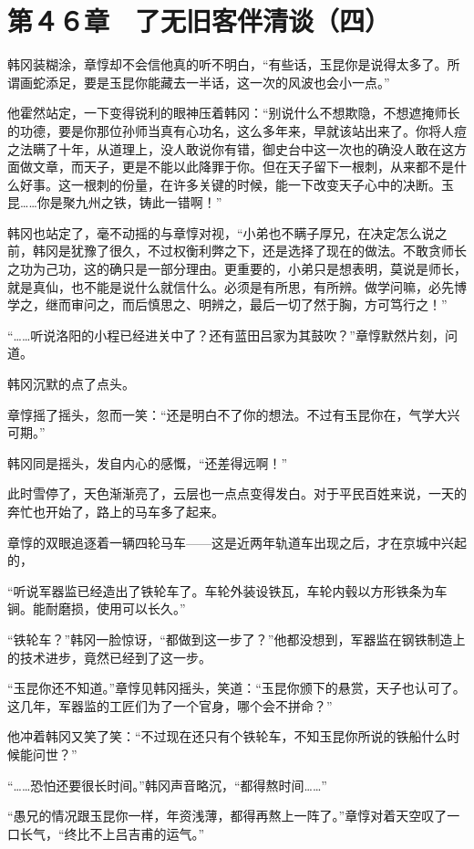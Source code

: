 \section{第４６章　了无旧客伴清谈（四）}

韩冈装糊涂，章惇却不会信他真的听不明白，“有些话，玉昆你是说得太多了。所谓画蛇添足，要是玉昆你能藏去一半话，这一次的风波也会小一点。”

他霍然站定，一下变得锐利的眼神压着韩冈：“别说什么不想欺隐，不想遮掩师长的功德，要是你那位孙师当真有心功名，这么多年来，早就该站出来了。你将人痘之法瞒了十年，从道理上，没人敢说你有错，御史台中这一次也的确没人敢在这方面做文章，而天子，更是不能以此降罪于你。但在天子留下一根刺，从来都不是什么好事。这一根刺的份量，在许多关键的时候，能一下改变天子心中的决断。玉昆……你是聚九州之铁，铸此一错啊！”

韩冈也站定了，毫不动摇的与章惇对视，“小弟也不瞒子厚兄，在决定怎么说之前，韩冈是犹豫了很久，不过权衡利弊之下，还是选择了现在的做法。不敢贪师长之功为己功，这的确只是一部分理由。更重要的，小弟只是想表明，莫说是师长，就是真仙，也不能是说什么就信什么。必须是有所思，有所辨。做学问嘛，必先博学之，继而审问之，而后慎思之、明辨之，最后一切了然于胸，方可笃行之！”

“……听说洛阳的小程已经进关中了？还有蓝田吕家为其鼓吹？”章惇默然片刻，问道。

韩冈沉默的点了点头。

章惇摇了摇头，忽而一笑：“还是明白不了你的想法。不过有玉昆你在，气学大兴可期。”

韩冈同是摇头，发自内心的感慨，“还差得远啊！”

此时雪停了，天色渐渐亮了，云层也一点点变得发白。对于平民百姓来说，一天的奔忙也开始了，路上的马车多了起来。

章惇的双眼追逐着一辆四轮马车——这是近两年轨道车出现之后，才在京城中兴起的，

“听说军器监已经造出了铁轮车了。车轮外装设铁瓦，车轮内毂以方形铁条为车锏。能耐磨损，使用可以长久。”

“铁轮车？”韩冈一脸惊讶，“都做到这一步了？”他都没想到，军器监在钢铁制造上的技术进步，竟然已经到了这一步。

“玉昆你还不知道。”章惇见韩冈摇头，笑道：“玉昆你颁下的悬赏，天子也认可了。这几年，军器监的工匠们为了一个官身，哪个会不拼命？”

他冲着韩冈又笑了笑：“不过现在还只有个铁轮车，不知玉昆你所说的铁船什么时候能问世？”

“……恐怕还要很长时间。”韩冈声音略沉，“都得熬时间……”

“愚兄的情况跟玉昆你一样，年资浅薄，都得再熬上一阵了。”章惇对着天空叹了一口长气，“终比不上吕吉甫的运气。”

